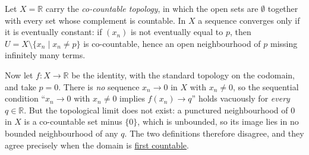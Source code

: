   \begin{example}
    \label{ex:counterexample}
    Let $X = \mathbb{R}$ carry the \textit{co-countable topology}, in which the open sets are $\emptyset$ together with every set whose complement is countable. In $X$ a sequence converges only if it is eventually constant: if $(x_n)$ is not eventually equal to $p$, then $U = X \setminus \{x_n \mid x_n \neq p\}$ is co-countable, hence an open neighbourhood of $p$ missing infinitely many terms.

    Now let $f: X \to \mathbb{R}$ be the identity, with the standard topology on the codomain, and take $p = 0$. There is \textit{no} sequence $x_n \to 0$ in $X$ with $x_n \neq 0$, so the sequential condition ``$x_n \to 0$ with $x_n \neq 0$ implies $f(x_n) \to q$'' holds vacuously for \textit{every} $q \in \mathbb{R}$. But the topological limit does not exist: a punctured neighbourhood of $0$ in $X$ is a co-countable set minus $\{0\}$, which is unbounded, so its image lies in no bounded neighbourhood of any $q$. The two definitions therefore disagree, and they agree precisely when the domain is \hyperref[def:1st-countability]{first countable}. 
  \end{example}

